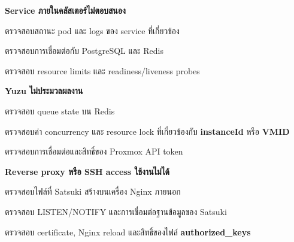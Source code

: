 \begin{mycustomenum2}
    \item \textbf{Service ภายในคลัสเตอร์ไม่ตอบสนอง}
    \begin{mycustomenum2}
        \item ตรวจสอบสถานะ pod และ logs ของ service ที่เกี่ยวข้อง
        \item ตรวจสอบการเชื่อมต่อกับ PostgreSQL และ Redis
        \item ตรวจสอบ resource limits และ readiness/liveness probes
    \end{mycustomenum2}
    \item \textbf{Yuzu ไม่ประมวลผลงาน}
    \begin{mycustomenum2}
        \item ตรวจสอบ queue state บน Redis
        \item ตรวจสอบค่า concurrency และ resource lock ที่เกี่ยวข้องกับ \textbf{instanceId} หรือ \textbf{VMID}
        \item ตรวจสอบการเชื่อมต่อและสิทธิ์ของ Proxmox API token
    \end{mycustomenum2}
    \item \textbf{Reverse proxy หรือ SSH access ใช้งานไม่ได้}
    \begin{mycustomenum2}
        \item ตรวจสอบไฟล์ที่ Satsuki สร้างบนเครื่อง Nginx ภายนอก
        \item ตรวจสอบ LISTEN/NOTIFY และการเชื่อมต่อฐานข้อมูลของ Satsuki
        \item ตรวจสอบ certificate, Nginx reload และสิทธิ์ของไฟล์ \textbf{authorized\_keys}
    \end{mycustomenum2}
\end{mycustomenum2}
